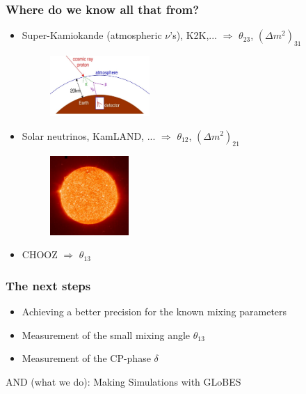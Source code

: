 \documentclass{beamer}
\begin{document}
\begin{frame}
	\frametitle{Where do we know all that from?}

\begin{itemize}

\item Super-Kamiokande (atmospheric $\nu$'s), K2K,... $\Rightarrow$ $\theta_{23}$, $(\Delta m^2)_{31}$
\begin{figure}
    \begin{center}
      \includegraphics[width=3.8cm]{fig/atm1.jpg}
    \end{center}
 \end{figure}

\item Solar neutrinos, KamLAND, ... $\Rightarrow$ $\theta_{12}$, $(\Delta m^2)_{21}$
\begin{figure}
    \begin{center}
      \includegraphics[width=3cm]{fig/sun.jpg}
    \end{center}
 \end{figure}

\item CHOOZ $\Rightarrow$ $\theta_{13}$

\end{itemize}

\end{frame}



\begin{frame}
\frametitle{The next steps}

\begin{itemize}
\item Achieving a better precision for the known mixing parameters
\item Measurement of the small mixing angle $\theta_{13}$
\item Measurement of the CP-phase $\delta$
\end{itemize}

\vspace{1.5cm}

\large{AND (what we do): Making Simulations with GLoBES }
\end{frame}
\end{document}
